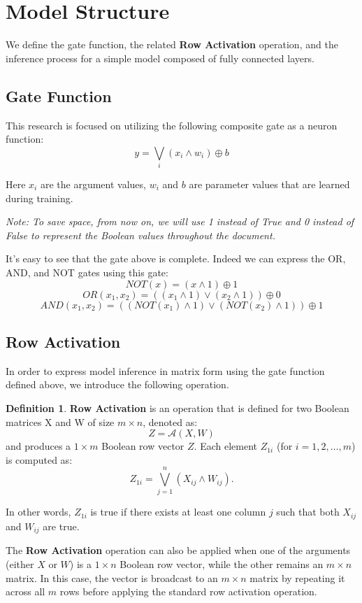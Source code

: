 \documentclass{article}
\theoremstyle{definition}
\newtheorem*{definition}{Definition}
\begin{document}
\section{Model Structure}
We define the gate function, the related \textbf{Row Activation} operation, and the inference process for a simple model composed of fully connected layers.

\subsection{Gate Function}
This research is focused on utilizing the following composite gate as a neuron function:
\[ y = \bigvee_{i} \left( x_{i} \wedge w_{i} \right) \oplus b \]

Here \(x_{i}\) are the argument values, \(w_{i}\) and \(b\) are parameter values that are learned during training.

\textit{Note: To save space, from now on, we will use 1 instead of True and 0 instead of False to represent the Boolean values throughout the document.}

It's easy to see that the gate above is complete. Indeed we can  express the OR, AND, and NOT gates using this gate:
\[ NOT(x) = \left( x \wedge 1 \right) \oplus 1 \]
\[ OR(x_1, x_2) = \left(\left( x_1 \wedge 1 \right) \vee \left( x_2 \wedge 1 \right) \right) \oplus 0 \]
\[ AND(x_1, x_2) = \left(\left( NOT(x_1) \wedge 1 \right) \vee \left( NOT(x_2) \wedge 1 \right) \right) \oplus 1 \]

\subsection{Row Activation}
In order to express model inference in matrix form using the gate function defined above, we introduce the following operation.

\begin{definition}
    \textbf{Row Activation} is an operation that is defined for two Boolean matrices X and W of size \( m \times n \), denoted as:
    \[ Z = \mathcal{A}(X, W) \]
    and produces a \( 1 \times m \) Boolean row vector \( Z \). Each element \( Z_{1i} \) (for \( i = 1, 2, \dots, m \)) is computed as:
    \[ Z_{1i} = \bigvee_{j=1}^{n} \left( X_{ij} \wedge W_{ij} \right). \]

    In other words, \( Z_{1i} \) is true if there exists at least one column \( j \) such that both \( X_{ij} \) and \( W_{ij} \) are true.

    The \textbf{Row Activation} operation can also be applied when one of the arguments (either \( X \) or \( W \)) is a \( 1 \times n \) Boolean row vector, while the other remains an \( m \times n \) matrix. In this case, the vector is broadcast to an \( m \times n \) matrix by repeating it across all \( m \) rows before applying the standard row activation operation.
\end{definition}
\end{document}
